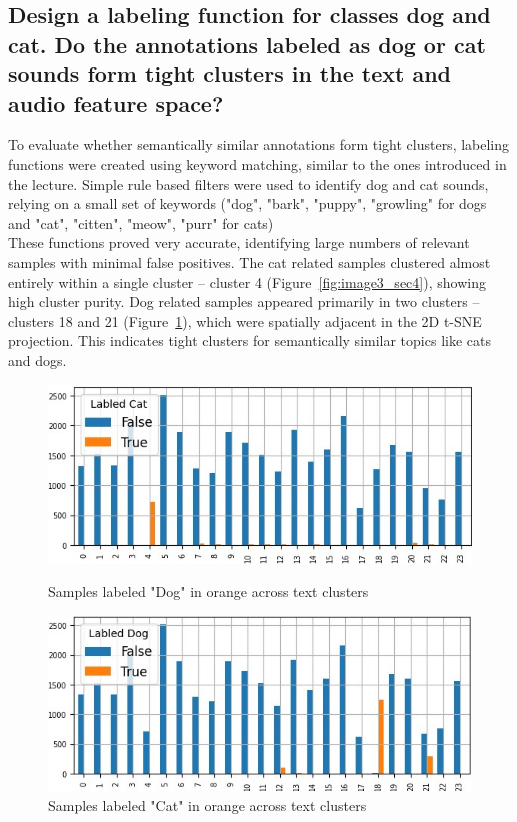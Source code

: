 \subsection{Design a labeling function for classes dog and cat. Do the annotations labeled as dog or cat sounds
form tight clusters in the text and audio feature space?}
\label{sec:Text Features:b}

To evaluate whether semantically similar annotations form tight clusters, labeling functions were created using keyword matching, similar to the ones introduced in the lecture. Simple rule based filters were used to identify dog and cat sounds, relying on a small set of keywords ("dog", "bark", "puppy", "growling" for dogs and "cat", "citten", "meow", "purr" for cats) \\
These functions proved very accurate, identifying large numbers of relevant samples with minimal false positives. The cat related samples clustered almost entirely within a single cluster -- cluster 4 (Figure~\ref{fig:image3_sec4}), showing high cluster purity. Dog related samples appeared primarily in two clusters -- clusters 18 and 21 (Figure~\ref{fig:image4_sec4}), which were spatially adjacent in the 2D t-SNE projection. This indicates tight clusters for semantically similar topics like cats and dogs.
\begin{figure}[ht]
  \centering
  \begin{minipage}[b]{0.49\textwidth}
    \centering
    \includegraphics[width=\textwidth]{figs/cat_text_cluster.jpg}
    \caption{Samples labeled "Dog" in orange across text clusters}
    \label{fig:image3_sec4}
  \end{minipage}
  \hfill
  \begin{minipage}[b]{0.49\textwidth}
    \centering
    \includegraphics[width=\textwidth]{figs/dog_text_cluster.jpg}
    \caption{Samples labeled "Cat" in orange across text clusters}
    \label{fig:image4_sec4}
  \end{minipage}
\end{figure}


